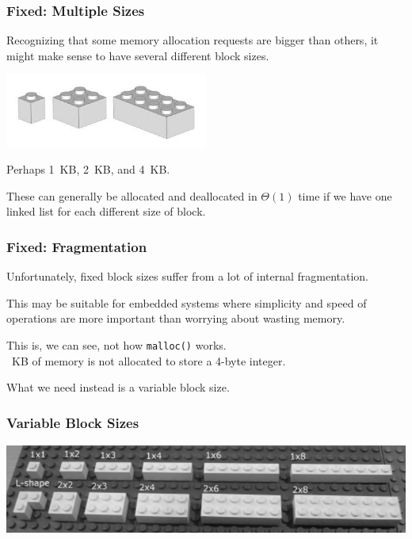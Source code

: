 \begin{frame}
\frametitle{Fixed: Multiple Sizes}

Recognizing that some memory allocation requests are bigger than others, it might make sense to have several different block sizes.

\begin{center}
	\includegraphics[width=0.5\textwidth]{images/lego3.jpg}
\end{center}

Perhaps 1~KB, 2~KB, and 4~KB. 

These can generally be allocated and deallocated in $\Theta(1)$ time if we have one linked list for each different size of block.


\end{frame}



\begin{frame}
\frametitle{Fixed: Fragmentation}

Unfortunately, fixed block sizes suffer from a lot of internal fragmentation. 

This may be suitable for embedded systems where simplicity and speed of operations are more important than worrying about wasting memory. 

This is, we can see, not how \texttt{malloc()} works.\\
~KB of memory is not allocated to store a 4-byte integer. 
 
What we need instead is a variable block size.


\end{frame}


\begin{frame}
\frametitle{Variable Block Sizes}

\begin{center}
	\includegraphics[width=\textwidth]{images/lego2.png}
\end{center}


\end{frame}


